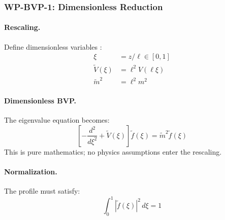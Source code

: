 \subsubsection{WP-BVP-1: Dimensionless Reduction}
\label{sec:bvp_dimensionless}

\paragraph{Rescaling.}
Define dimensionless variables \tagDc{}:
\begin{align}
    \xi &= z/\ell \in [0,1] \label{eq:bvp_xi} \\
    \tilde{V}(\xi) &= \ell^2 V(\ell\xi) \label{eq:bvp_vtilde} \\
    \tilde{m}^2 &= \ell^2 m^2 \label{eq:bvp_mtilde}
\end{align}

\paragraph{Dimensionless BVP.}
The eigenvalue equation becomes:
\begin{equation}
    \left[ -\frac{d^2}{d\xi^2} + \tilde{V}(\xi) \right] \tilde{f}(\xi) = \tilde{m}^2 \tilde{f}(\xi)
    \label{eq:bvp_dimensionless}
\end{equation}
This is pure mathematics; no physics assumptions enter the rescaling.

\paragraph{Normalization.}
The profile must satisfy:
\begin{equation}
    \int_0^1 |\tilde{f}(\xi)|^2 \, d\xi = 1
    \label{eq:bvp_normalization}
\end{equation}


